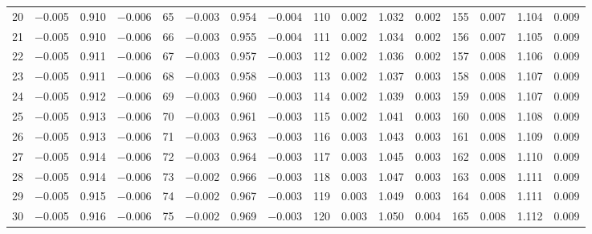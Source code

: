 \begin{table}[!h]
{\begin{tabular}{rrrr|rrrr|rrrr|crrr}
 20 & \tiny{ $-$0.005} &   0.910 & \tiny{ $-$0.006} &  65 & \tiny{ $-$0.003} &   0.954 & \tiny{ $-$0.004} & 110 & \tiny{  0.002} &   1.032 & \tiny{  0.002} & 155 & \tiny{  0.007} &   1.104 & \tiny{  0.009}\\
 21 & \tiny{ $-$0.005} &   0.910 & \tiny{ $-$0.006} &  66 & \tiny{ $-$0.003} &   0.955 & \tiny{ $-$0.004} & 111 & \tiny{  0.002} &   1.034 & \tiny{  0.002} & 156 & \tiny{  0.007} &   1.105 & \tiny{  0.009}\\
 22 & \tiny{ $-$0.005} &   0.911 & \tiny{ $-$0.006} &  67 & \tiny{ $-$0.003} &   0.957 & \tiny{ $-$0.003} & 112 & \tiny{  0.002} &   1.036 & \tiny{  0.002} & 157 & \tiny{  0.008} &   1.106 & \tiny{  0.009}\\
 23 & \tiny{ $-$0.005} &   0.911 & \tiny{ $-$0.006} &  68 & \tiny{ $-$0.003} &   0.958 & \tiny{ $-$0.003} & 113 & \tiny{  0.002} &   1.037 & \tiny{  0.003} & 158 & \tiny{  0.008} &   1.107 & \tiny{  0.009}\\
 24 & \tiny{ $-$0.005} &   0.912 & \tiny{ $-$0.006} &  69 & \tiny{ $-$0.003} &   0.960 & \tiny{ $-$0.003} & 114 & \tiny{  0.002} &   1.039 & \tiny{  0.003} & 159 & \tiny{  0.008} &   1.107 & \tiny{  0.009}\\
 25 & \tiny{ $-$0.005} &   0.913 & \tiny{ $-$0.006} &  70 & \tiny{ $-$0.003} &   0.961 & \tiny{ $-$0.003} & 115 & \tiny{  0.002} &   1.041 & \tiny{  0.003} & 160 & \tiny{  0.008} &   1.108 & \tiny{  0.009}\\
 26 & \tiny{ $-$0.005} &   0.913 & \tiny{ $-$0.006} &  71 & \tiny{ $-$0.003} &   0.963 & \tiny{ $-$0.003} & 116 & \tiny{  0.003} &   1.043 & \tiny{  0.003} & 161 & \tiny{  0.008} &   1.109 & \tiny{  0.009}\\
 27 & \tiny{ $-$0.005} &   0.914 & \tiny{ $-$0.006} &  72 & \tiny{ $-$0.003} &   0.964 & \tiny{ $-$0.003} & 117 & \tiny{  0.003} &   1.045 & \tiny{  0.003} & 162 & \tiny{  0.008} &   1.110 & \tiny{  0.009}\\
 28 & \tiny{ $-$0.005} &   0.914 & \tiny{ $-$0.006} &  73 & \tiny{ $-$0.002} &   0.966 & \tiny{ $-$0.003} & 118 & \tiny{  0.003} &   1.047 & \tiny{  0.003} & 163 & \tiny{  0.008} &   1.111 & \tiny{  0.009}\\
 29 & \tiny{ $-$0.005} &   0.915 & \tiny{ $-$0.006} &  74 & \tiny{ $-$0.002} &   0.967 & \tiny{ $-$0.003} & 119 & \tiny{  0.003} &   1.049 & \tiny{  0.003} & 164 & \tiny{  0.008} &   1.111 & \tiny{  0.009}\\
 30 & \tiny{ $-$0.005} &   0.916 & \tiny{ $-$0.006} &  75 & \tiny{ $-$0.002} &   0.969 & \tiny{ $-$0.003} & 120 & \tiny{  0.003} &   1.050 & \tiny{  0.004} & 165 & \tiny{  0.008} &   1.112 & \tiny{  0.009}\\

\end{tabular}}
\end{table}
